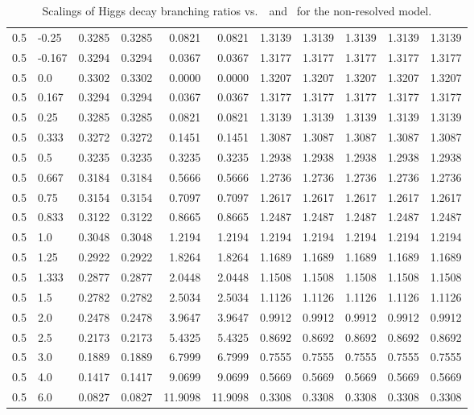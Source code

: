 \begin{table}[h!]
\begin{tabular}{ll rrrrrrrrr}
   0.5  & -0.25  & 0.3285 & 0.3285 & 0.0821  & 0.0821  & 1.3139 & 1.3139 & 1.3139 & 1.3139 & 1.3139 \\
   0.5  & -0.167 & 0.3294 & 0.3294 & 0.0367  & 0.0367  & 1.3177 & 1.3177 & 1.3177 & 1.3177 & 1.3177 \\
   0.5  & 0.0    & 0.3302 & 0.3302 & 0.0000  & 0.0000  & 1.3207 & 1.3207 & 1.3207 & 1.3207 & 1.3207 \\
   0.5  & 0.167  & 0.3294 & 0.3294 & 0.0367  & 0.0367  & 1.3177 & 1.3177 & 1.3177 & 1.3177 & 1.3177 \\
   0.5  & 0.25   & 0.3285 & 0.3285 & 0.0821  & 0.0821  & 1.3139 & 1.3139 & 1.3139 & 1.3139 & 1.3139 \\
   0.5  & 0.333  & 0.3272 & 0.3272 & 0.1451  & 0.1451  & 1.3087 & 1.3087 & 1.3087 & 1.3087 & 1.3087 \\
   0.5  & 0.5    & 0.3235 & 0.3235 & 0.3235  & 0.3235  & 1.2938 & 1.2938 & 1.2938 & 1.2938 & 1.2938 \\
   0.5  & 0.667  & 0.3184 & 0.3184 & 0.5666  & 0.5666  & 1.2736 & 1.2736 & 1.2736 & 1.2736 & 1.2736 \\
   0.5  & 0.75   & 0.3154 & 0.3154 & 0.7097  & 0.7097  & 1.2617 & 1.2617 & 1.2617 & 1.2617 & 1.2617 \\
   0.5  & 0.833  & 0.3122 & 0.3122 & 0.8665  & 0.8665  & 1.2487 & 1.2487 & 1.2487 & 1.2487 & 1.2487 \\
   0.5  & 1.0    & 0.3048 & 0.3048 & 1.2194  & 1.2194  & 1.2194 & 1.2194 & 1.2194 & 1.2194 & 1.2194 \\
   0.5  & 1.25   & 0.2922 & 0.2922 & 1.8264  & 1.8264  & 1.1689 & 1.1689 & 1.1689 & 1.1689 & 1.1689 \\
   0.5  & 1.333  & 0.2877 & 0.2877 & 2.0448  & 2.0448  & 1.1508 & 1.1508 & 1.1508 & 1.1508 & 1.1508 \\
   0.5  & 1.5    & 0.2782 & 0.2782 & 2.5034  & 2.5034  & 1.1126 & 1.1126 & 1.1126 & 1.1126 & 1.1126 \\
   0.5  & 2.0    & 0.2478 & 0.2478 & 3.9647  & 3.9647  & 0.9912 & 0.9912 & 0.9912 & 0.9912 & 0.9912 \\
   0.5  & 2.5    & 0.2173 & 0.2173 & 5.4325  & 5.4325  & 0.8692 & 0.8692 & 0.8692 & 0.8692 & 0.8692 \\
   0.5  & 3.0    & 0.1889 & 0.1889 & 6.7999  & 6.7999  & 0.7555 & 0.7555 & 0.7555 & 0.7555 & 0.7555 \\
   0.5  & 4.0    & 0.1417 & 0.1417 & 9.0699  & 9.0699  & 0.5669 & 0.5669 & 0.5669 & 0.5669 & 0.5669 \\
   0.5  & 6.0    & 0.0827 & 0.0827 & 11.9098 & 11.9098 & 0.3308 & 0.3308 & 0.3308 & 0.3308 & 0.3308 \\\hline
    \end{tabular}
    \caption{Scalings of Higgs decay branching ratios vs.\ \Ct\ and \ for the non-resolved model.}\label{tab:brscalingK6_0p5}
 \end{table}

